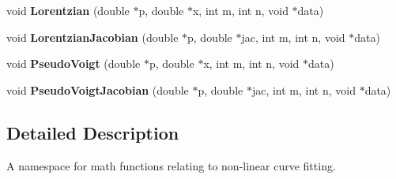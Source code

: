 \begin{DoxyCompactItemize}
\item 
\hypertarget{namespace_vespucci_1_1_math_1_1_fitting_ac720c74022d65f7f11b1b301842beebb}{void {\bfseries Lorentzian} (double $\ast$p, double $\ast$x, int m, int n, void $\ast$data)}\label{namespace_vespucci_1_1_math_1_1_fitting_ac720c74022d65f7f11b1b301842beebb}

\item 
\hypertarget{namespace_vespucci_1_1_math_1_1_fitting_a46da5c5db0cd303cd4b1e5831ca95ee8}{void {\bfseries Lorentzian\+Jacobian} (double $\ast$p, double $\ast$jac, int m, int n, void $\ast$data)}\label{namespace_vespucci_1_1_math_1_1_fitting_a46da5c5db0cd303cd4b1e5831ca95ee8}

\item 
\hypertarget{namespace_vespucci_1_1_math_1_1_fitting_a861a613f20ecc6d496c2eb06ec183e0a}{void {\bfseries Pseudo\+Voigt} (double $\ast$p, double $\ast$x, int m, int n, void $\ast$data)}\label{namespace_vespucci_1_1_math_1_1_fitting_a861a613f20ecc6d496c2eb06ec183e0a}

\item 
\hypertarget{namespace_vespucci_1_1_math_1_1_fitting_a9fbd24e3adec9a9da998bd2c6e5be478}{void {\bfseries Pseudo\+Voigt\+Jacobian} (double $\ast$p, double $\ast$jac, int m, int n, void $\ast$data)}\label{namespace_vespucci_1_1_math_1_1_fitting_a9fbd24e3adec9a9da998bd2c6e5be478}

\end{DoxyCompactItemize}


\subsection{Detailed Description}
A namespace for math functions relating to non-\/linear curve fitting. 

